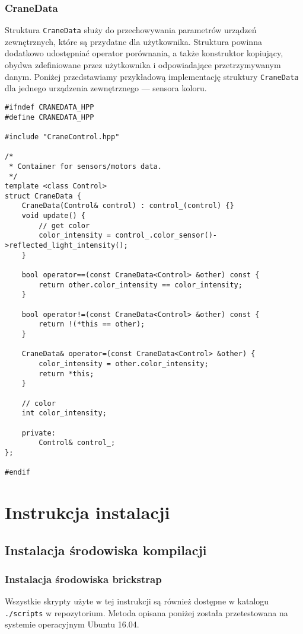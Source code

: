 \documentclass{article}
\begin{document}
\subsubsection*{CraneData}
Struktura \texttt{CraneData} służy do przechowywania parametrów
urządzeń zewnętrznych, które są przydatne dla użytkownika. Struktura powinna
dodatkowo udostępniać operator porównania, a także konstruktor kopiujący, obydwa
zdefiniowane przez użytkownika i odpowiadające przetrzymywanym danym. Poniżej
przedstawiamy przykładową implementację struktury \texttt{CraneData} dla jednego
urządzenia zewnętrznego --- sensora koloru.
\begin{lstlisting}
#ifndef CRANEDATA_HPP
#define CRANEDATA_HPP

#include "CraneControl.hpp"

/*
 * Container for sensors/motors data.
 */
template <class Control>
struct CraneData {
    CraneData(Control& control) : control_(control) {}
    void update() {
        // get color
        color_intensity = control_.color_sensor()->reflected_light_intensity();
    }

    bool operator==(const CraneData<Control> &other) const {
        return other.color_intensity == color_intensity;
    }

    bool operator!=(const CraneData<Control> &other) const {
        return !(*this == other);
    }

    CraneData& operator=(const CraneData<Control> &other) {
        color_intensity = other.color_intensity;
        return *this;
    }

    // color
    int color_intensity;

    private:
        Control& control_;
};

#endif
\end{lstlisting}
\section{Instrukcja instalacji}
\subsection{Instalacja środowiska kompilacji}
\subsubsection*{Instalacja środowiska brickstrap}\label{instr_brickstrap}
Wszystkie skrypty użyte w tej instrukcji są również dostępne w katalogu
\texttt{./scripts} w repozytorium. Metoda opisana poniżej została
przetestowana na systemie operacyjnym Ubuntu 16.04.
\end{document}
